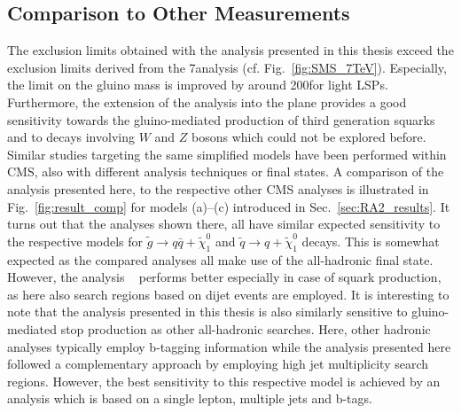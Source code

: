 \subsection{Comparison to Other Measurements}
\label{subsec:RA2_comp}
The exclusion limits obtained with the analysis presented in this thesis exceed the exclusion limits derived from the 7\tev analysis (cf. Fig.~\ref{fig:SMS_7TeV}). Especially, the limit on the gluino mass is improved by around 200\gev for light LSPs. Furthermore, the extension of the analysis into the \NJets plane provides a good sensitivity towards the gluino-mediated production of third generation squarks and to decays involving $W$ and $Z$ bosons which could not be explored before. \\
Similar studies targeting the same simplified models have been performed within CMS, also with different analysis techniques or final states. A comparison of the analysis presented here, to the respective other CMS analyses is illustrated in Fig.~\ref{fig:result_comp} for models (a)--(c) introduced in Sec.~\ref{sec:RA2_results}. It turns out that the analyses shown there, all have similar expected sensitivity to the respective models for $\tilde{g} \rightarrow q\bar{q} + \tilde{\chi}_1^0$ and $\tilde{q} \rightarrow q + \tilde{\chi}_1^0$ decays. This is somewhat expected as the compared analyses all make use of the all-hadronic final state. However, the analysis ~\cite{CMS-PAS-SUS-13-019} performs better especially in case of squark production, as here also search regions based on dijet events are employed. It is interesting to note that the analysis presented in this thesis is also similarly sensitive to gluino-mediated stop production as other all-hadronic searches. Here, other hadronic analyses typically employ b-tagging information  while the analysis presented here followed a complementary approach by employing high jet multiplicity search regions. However, the best sensitivity to this respective model is achieved by an analysis which is based on a single lepton, multiple jets and b-tags. 
